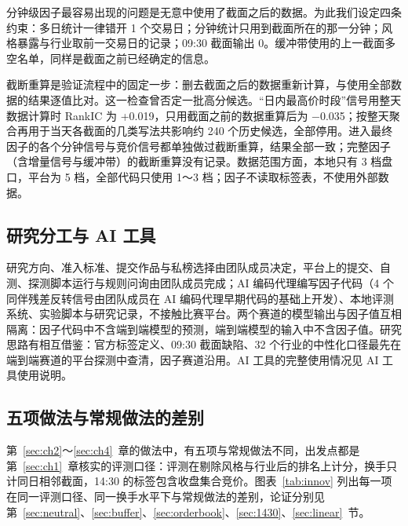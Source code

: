 \documentclass[UTF8,a4paper,zihao=-4,fontset=none]{ctexart}
\begin{document}
分钟级因子最容易出现的问题是无意中使用了截面之后的数据。为此我们设定四条约束：多日统计一律错开 1 个交易日；分钟统计只用到截面所在的那一分钟；风格暴露与行业取前一交易日的记录；09:30 截面输出 0。缓冲带使用的上一截面多空名单，同样是截面之前已经确定的信息。

截断重算是验证流程中的固定一步：删去截面之后的数据重新计算，与使用全部数据的结果逐值比对。这一检查曾否定一批高分候选。“日内最高价时段”信号用整天数据计算时 RankIC 为 +0.019，只用截面之前的数据重算后为 −0.035；按整天聚合再用于当天各截面的几类写法共影响约 240 个历史候选，全部停用。进入最终因子的各个分钟信号与竞价信号都单独做过截断重算，结果全部一致；完整因子（含增量信号与缓冲带）的截断重算没有记录。数据范围方面，本地只有 3 档盘口，平台为 5 档，全部代码只使用 1～3 档；因子不读取标签表，不使用外部数据。

\subsection{研究分工与 AI 工具}\label{sec:ai}

研究方向、准入标准、提交作品与私榜选择由团队成员决定，平台上的提交、自测、探测脚本运行与规则问询由团队成员完成；AI 编码代理编写因子代码（4 个同伴残差反转信号由团队成员在 AI 编码代理早期代码的基础上开发）、本地评测系统、实验脚本与研究记录，不接触比赛平台。两个赛道的模型输出与因子值互相隔离：因子代码中不含端到端模型的预测，端到端模型的输入中不含因子值。研究思路有相互借鉴：官方标签定义、09:30 截面缺陷、32 个行业的中性化口径最先在端到端赛道的平台探测中查清，因子赛道沿用。AI 工具的完整使用情况见 AI 工具使用说明。

\subsection{五项做法与常规做法的差别}\label{sec:innov}

第~\ref{sec:ch2}～\ref{sec:ch4}~章的做法中，有五项与常规做法不同，出发点都是第~\ref{sec:ch1}~章核实的评测口径：评测在剔除风格与行业后的排名上计分，换手只计同日相邻截面，14:30 的标签包含收盘集合竞价。图表~\ref{tab:innov} 列出每一项在同一评测口径、同一换手水平下与常规做法的差别，论证分别见第~\ref{sec:neutral}、\ref{sec:buffer}、\ref{sec:orderbook}、\ref{sec:1430}、\ref{sec:linear}~节。
\end{document}
